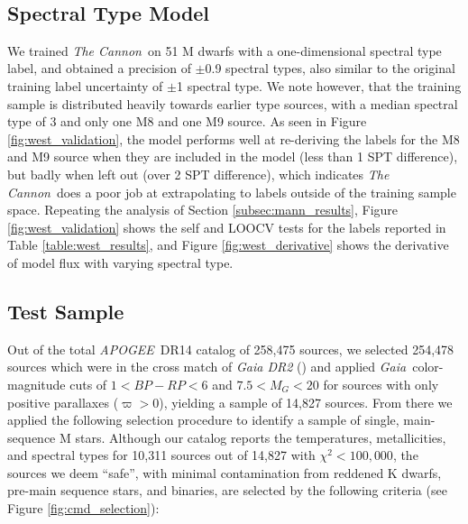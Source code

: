 \documentclass[modern]{aastex62}
\newcommand{\apogee}{\textsl{APOGEE}}
\newcommand{\thecannon}{\textsl{The Cannon}}
\newcommand{\gaia}{\textsl{Gaia}}
\begin{document}
\color{gcolor}{HOGG: Adam's comment: if $\chi^2/n>>1$ then the model is NOT an accurate representation of the data.}\color{black} \\

\subsection{Spectral Type Model \label{subsec:west_results}}

We trained \thecannon\ on 51 M dwarfs with a one-dimensional spectral type label, and obtained a precision of $\pm$0.9 spectral types, also similar to the original training label uncertainty of $\pm$1 spectral type. We note however, that the training sample is distributed heavily towards earlier type sources, with a median spectral type of 3 and only one M8 and one M9 source. As seen in Figure \ref{fig:west_validation}, the model performs well at re-deriving the labels for the M8 and M9 source when they are included in the model (less than 1 SPT difference), but badly when left out (over 2 SPT difference), which indicates \thecannon\ does a poor job at extrapolating to labels outside of the training sample space. Repeating the analysis of Section \ref{subsec:mann_results}, Figure \ref{fig:west_validation} shows the self and LOOCV tests for the labels reported in Table \ref{table:west_results}, and Figure \ref{fig:west_derivative} shows the derivative of model flux with varying spectral type.

\subsection{Test Sample \label{subsec:test_selection}} 
Out of the total \apogee\ DR14 catalog of 258,475 sources, we selected 254,478 sources which were in the cross match of \textsl{Gaia DR2} (\citealt{Brown:2018}) and applied \gaia\ color-magnitude cuts of $1<BP-RP<6$ and $7.5<M_G<20$ for sources with only positive parallaxes ($\varpi>0$), yielding a sample of 14,827 sources. From there we applied the following selection procedure to identify a sample of single, main-sequence M stars. Although our catalog reports the temperatures, metallicities, and spectral types for 10,311 sources out of 14,827 with $\chi^2<100,000$, the sources we deem ``safe'', with minimal contamination from reddened K dwarfs, pre-main sequence stars, and binaries, are selected by the following criteria (see Figure \ref{fig:cmd_selection}):
\end{document}
